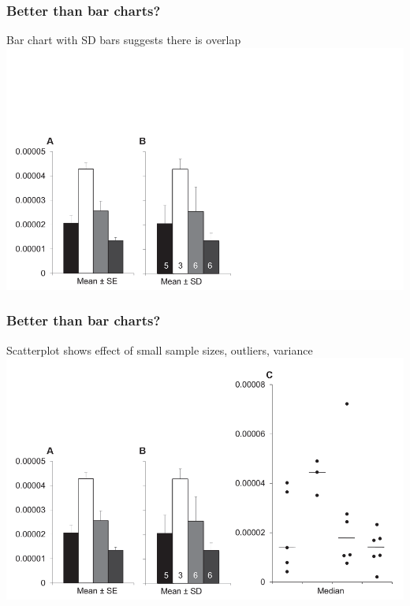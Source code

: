 \begin{frame}
  \frametitle{Better than bar charts?}
  \textcolor{hutton_blue}{Bar chart with SD bars suggests there is overlap}
    \includegraphics[width=1\textwidth]{images/weissgerber_bar_scatter2}    
\end{frame}

\begin{frame}
  \frametitle{Better than bar charts?}
  \textcolor{hutton_purple}{Scatterplot shows effect of small sample sizes, outliers, variance}
    \includegraphics[width=1\textwidth]{images/weissgerber_bar_scatter3}    
\end{frame}